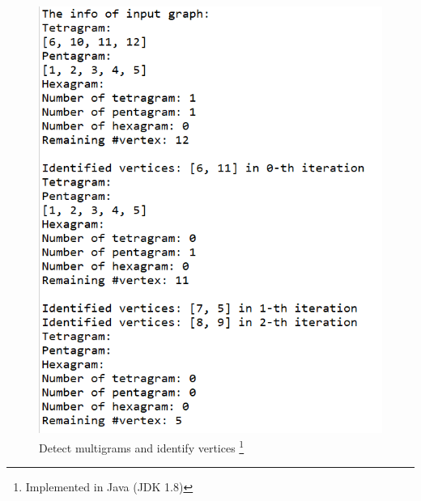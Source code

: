 \begin{figure}[htbp]
\centering
\begin{minipage}[t]{0.48\textwidth}
\centering
\includegraphics[width=1\textwidth]{figure/program identify.png}
\caption{\footnotesize  Detect multigrams and identify vertices \footnote{Implemented in Java (JDK 1.8)}}
\end{minipage}
\begin{minipage}[t]{0.48\textwidth}
\centering

\end{minipage}
\end{figure}
